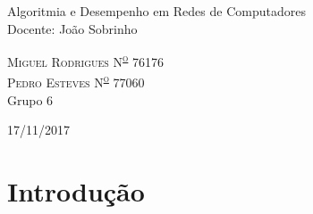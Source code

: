 \documentclass[twocolumn]{article} %
\begin{document}
\begin{titlepage}
	Algoritmia e Desempenho em Redes de Computadores \\ Docente: João Sobrinho

	\vspace*{3\baselineskip} %
	
	
	
	\vspace{0.5\baselineskip} %
	
	{\scshape\Large Miguel Rodrigues N\textsuperscript{\underline{o}} 76176 \\ Pedro Esteves N\textsuperscript{\underline{o}} 77060 \\} %
	Grupo 6 \\
	
	\vspace{0.5\baselineskip} %
	
	\vfill %
	
	\vspace{0.3\baselineskip} %
	
	17/11/2017 %

\end{titlepage}



	
	\section{Introdução}
\end{document}
